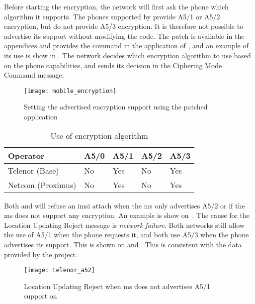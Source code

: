       Before starting the encryption, the network will first ask the
      phone which algorithm it supports. The phones supported by
       provide A5/1 or A5/2 encryption, but do not
      provide A5/3 encryption. It is therefore not possible to advertise
      its support without modifying the code. The patch is available in
      the appendices  and provides the
       command in the  application of
      , and an example of its use is show in
      . The network decides which encryption
      algorithm to use based on the phone capabilities, and sends its
      decision in the Ciphering Mode Command message.

      \begin{figure}[h]
        \centering
        \texttt{[image: mobile\_encryption]}
        \caption{Setting the advertised encryption support using the patched
         application}
        \label{fig:mobile_encryption}
      \end{figure}
      

      \begin{table}[h]
        \centering
        \begin{tabular}{@{}lllll@{}}
          \toprule
          Operator          & A5/0  & A5/1 & A5/2 & A5/3 \\
          \midrule
          Telenor (Base)    & No    & Yes & No    & Yes  \\
          Netcom (Proximus) & No    & Yes & No    & Yes  \\
          \bottomrule
        \end{tabular}
        \caption{Use of encryption algorithm}
        \label{tab:plaintext}
      \end{table}

      Both  and  will refuse an \gls{imsi}
      attach when the \gls{ms} only advertises A5/2 or if the \gls{ms}
      does not support any encryption. An example is show
      on~. The cause for the Location Updating
      Reject message is \emph{network failure}. Both networks still
      allow the use of A5/1 when the phone requests it, and both use
      A5/3 when the phone advertises its support. This is shown on
       and . This is
      consistent with the data provided by the  project.

      \begin{figure}
        \centering
        \texttt{[image: telenor\_a52]}
        \caption{Location Updating Reject when \gls{ms} does not
        advertises A5/1 support on }
        \label{fig:telenor_a52}
      \end{figure}

